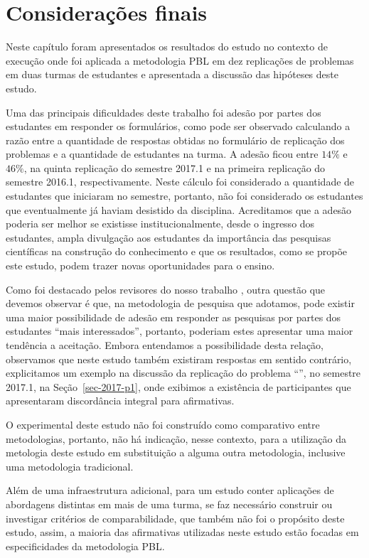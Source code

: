 \section{Considerações finais}
\label{sec-consideracoes-resultados}
Neste capítulo foram apresentados os resultados do estudo no contexto de execução onde foi aplicada a
metodologia PBL em dez replicações de problemas em duas turmas de estudantes e apresentada a discussão
das hipóteses deste estudo.

Uma das principais dificuldades deste trabalho foi adesão
por partes dos estudantes em responder os formulários,
como pode ser observado calculando a razão entre
a quantidade de respostas obtidas no formulário de
replicação dos problemas e a quantidade de estudantes
na turma.
A adesão ficou entre $14\%$ e $46\%$, na
quinta replicação do semestre 2017.1 e na primeira
replicação do semestre 2016.1, respectivamente.
Neste cálculo foi considerado a quantidade de estudantes
que iniciaram no semestre, portanto, não foi considerado os
estudantes que eventualmente já haviam desistido
da disciplina.
Acreditamos que a adesão poderia ser melhor se existisse
institucionalmente, desde o ingresso dos estudantes,
ampla divulgação aos estudantes da importância das pesquisas
científicas na construção do conhecimento e que os resultados,
como se propõe este estudo, podem trazer novas oportunidades
para o ensino.

Como foi destacado pelos revisores do nosso trabalho \cite{gavaza2017},
outra questão que devemos observar é que, na metodologia de pesquisa
que adotamos, pode existir uma maior possibilidade
de adesão em responder as pesquisas por partes
dos estudantes ``mais interessados'', portanto, poderiam
estes apresentar uma maior tendência a aceitação.
Embora entendamos a possibilidade desta relação, observamos que
neste estudo também existiram respostas em sentido
contrário, explicitamos um exemplo na discussão da
replicação do problema ``\ProblemaG'', no semestre 2017.1,
na Seção~\ref{sec-2017-p1}, onde exibimos a existência
de participantes que apresentaram discordância integral
para afirmativas.

O experimental deste estudo não foi construído como comparativo
entre metodologias, portanto, não há indicação, nesse
contexto, para a utilização da metologia deste estudo
em substituição a alguma outra metodologia, inclusive uma
metodologia tradicional.

Além de uma infraestrutura adicional, para um estudo conter
aplicações de abordagens distintas em mais de uma turma,
se faz necessário construir ou investigar critérios de
comparabilidade, que também não foi o propósito deste estudo,
assim, a maioria das afirmativas utilizadas neste estudo
estão focadas em especificidades da metodologia PBL.


